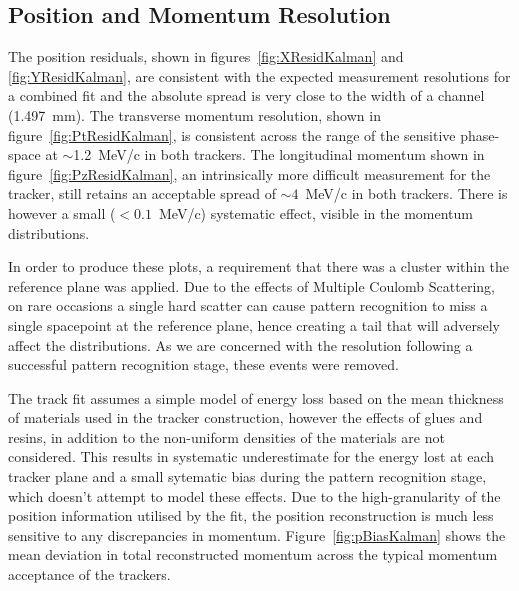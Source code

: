   \subsection{Position and Momentum Resolution}
  \label{sec:performance:resolutions}
  

  The position residuals, shown in figures~\ref{fig:XResidKalman} and \ref{fig:YResidKalman}, are consistent with the expected measurement resolutions for a combined fit and the absolute spread is very close to the width of a channel (1.497~mm). The transverse momentum resolution, shown in figure~\ref{fig:PtResidKalman}, is consistent across the range of the sensitive phase-space at $\sim$1.2~MeV/c in both trackers. The longitudinal momentum shown in figure~\ref{fig:PzResidKalman}, an intrinsically more difficult measurement for the tracker, still retains an acceptable spread of ${\sim4}$~MeV/c in both trackers. There is however a small ($<0.1$~MeV/c) systematic effect, visible in the momentum distributions.

  In order to produce these plots, a requirement that there was a cluster within the reference plane was applied. Due to the effects of Multiple Coulomb Scattering, on rare occasions a single hard scatter can cause pattern recognition to miss a single spacepoint at the reference plane, hence creating a tail that will adversely affect the distributions. As we are concerned with the resolution following a successful pattern recognition stage, these events were removed.
  
  The track fit assumes a simple model of energy loss based on the mean thickness of materials used in the tracker construction, however the effects of glues and resins, in addition to the non-uniform densities of the materials are not considered. This results in systematic underestimate for the energy lost at each tracker plane and a small sytematic bias during the pattern recognition stage, which doesn't attempt to model these effects. Due to the high-granularity of the position information utilised by the fit, the position reconstruction is much less sensitive to any discrepancies in momentum. Figure~\ref{fig:pBiasKalman} shows the mean deviation in total reconstructed momentum across the typical momentum acceptance of the trackers.

